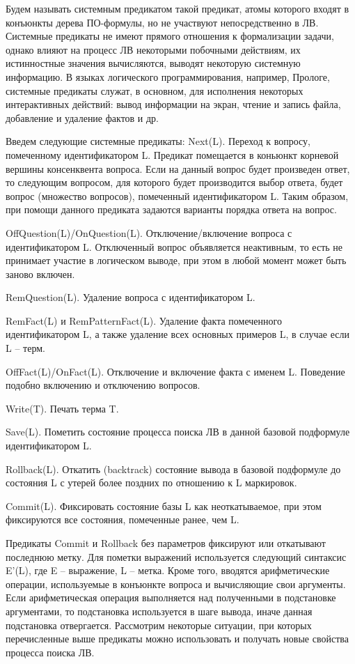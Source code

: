 Будем называть системным предикатом такой предикат, атомы которого входят в конъюнкты дерева ПО-формулы, но не участвуют непосредственно в ЛВ. Системные предикаты не имеют прямого отношения к формализации задачи, однако влияют на процесс ЛВ некоторыми побочными действиям, их истинностные значения вычисляются, выводят некоторую системную информацию. В языках логического программирования, например, Прологе, системные предикаты служат, в основном, для исполнения некоторых интерактивных действий: вывод информации на экран, чтение и запись файла, добавление и удаление фактов и др.

Введем следующие системные предикаты:
Next(L). Переход к вопросу, помеченному идентификатором L. Предикат помещается в коньюнкт корневой вершины консенквента вопроса.  Если на данный вопрос будет произведен ответ, то следующим вопросом, для которого будет производится выбор ответа, будет вопрос (множество вопросов), помеченный идентификатором L. Таким образом, при помощи данного предиката задаются варианты порядка ответа на вопрос.

OffQuestion(L)/OnQuestion(L). Отключение/включение вопроса с идентификатором L. Отключенный вопрос объявляется неактивным, то есть не принимает участие в логическом выводе, при этом в любой момент может быть заново включен.

RemQuestion(L). Удаление вопроса с идентификатором L.

RemFact(L) и RemPatternFact(L). Удаление факта помеченного идентификатором L, а также удаление всех основных примеров L, в случае если L – терм.

OffFact(L)/OnFact(L). Отключение и включение факта с именем L. Поведение подобно включению и отключению вопросов.

Write(T). Печать терма T.

Save(L). Пометить состояние процесса поиска ЛВ в данной базовой подформуле идентификатором L.

Rollback(L). Откатить (backtrack) состояние вывода в базовой подформуле до состояния L с утерей более поздних по отношению к L маркировок.

Commit(L). Фиксировать состояние базы L как неоткатываемое, при этом фиксируются все состояния, помеченные ранее, чем L.

Предикаты Commit и Rollback без параметров фиксируют или откатывают последнюю метку.
Для пометки выражений используется следующий синтаксис E’(L), где E – выражение, L – метка.
Кроме того, вводятся арифметические операции, используемые в конъюнкте вопроса и вычисляющие свои аргументы. Если арифметическая операция выполняется над полученными в подстановке аргументами, то подстановка используется в шаге вывода, иначе данная подстановка отвергается.
Рассмотрим некоторые ситуации, при которых перечисленные выше предикаты можно использовать и получать новые свойства процесса поиска ЛВ.

